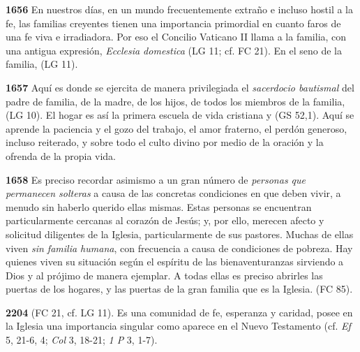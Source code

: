 \begin{body}
\begin{body}
\textbf{1656} En nuestros días, en un mundo frecuentemente extraño e incluso hostil a la fe, las familias creyentes tienen una importancia primordial en cuanto faros de una fe viva e irradiadora. Por eso el Concilio Vaticano II llama a la familia, con una antigua expresión, \emph{Ecclesia domestica} (LG 11; cf. FC 21). En el seno de la familia,  (LG 11).

\textbf{1657} Aquí es donde se ejercita de manera privilegiada el \emph{sacerdocio bautismal} del padre de familia, de la madre, de los hijos, de todos los miembros de la familia,  (LG 10). El hogar es así la primera escuela de vida cristiana y  (GS 52,1). Aquí se aprende la paciencia y el gozo del trabajo, el amor fraterno, el perdón generoso, incluso reiterado, y sobre todo el culto divino por medio de la oración y la ofrenda de la propia vida.

\textbf{1658} Es preciso recordar asimismo a un gran número de \emph{personas que permanecen solteras} a causa de las concretas condiciones en que deben vivir, a menudo sin haberlo querido ellas mismas. Estas personas se encuentran particularmente cercanas al corazón de Jesús; y, por ello, merecen afecto y solicitud diligentes de la Iglesia, particularmente de sus pastores. Muchas de ellas viven \emph{sin familia humana}, con frecuencia a causa de condiciones de pobreza. Hay quienes viven su situación según el espíritu de las bienaventuranzas sirviendo a Dios y al prójimo de manera ejemplar. A todas ellas es preciso abrirles las puertas de los hogares,  y las puertas de la gran familia que es la Iglesia.  (FC 85).

\textbf{2204}  (FC 21, cf. LG 11). Es una comunidad de fe, esperanza y caridad, posee en la Iglesia una importancia singular como aparece en el Nuevo Testamento (cf. \emph{Ef} 5, 21-6, 4; \emph{Col} 3, 18-21; \emph{1 P} 3, 1-7).


\end{body}
\end{body}
